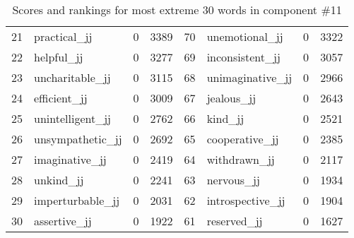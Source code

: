 \begin{table}[tbp]
\begin{tabular}{| rlr@{.}l | rlr@{.}l |}
    21 & practical\_jj & 0 & 3389    &    70 & unemotional\_jj & 0 & 3322 \\
    22 & helpful\_jj & 0 & 3277    &    69 & inconsistent\_jj & 0 & 3057 \\
    23 & uncharitable\_jj & 0 & 3115    &    68 & unimaginative\_jj & 0 & 2966 \\
    24 & efficient\_jj & 0 & 3009    &    67 & jealous\_jj & 0 & 2643 \\
    25 & unintelligent\_jj & 0 & 2762    &    66 & kind\_jj & 0 & 2521 \\
    26 & unsympathetic\_jj & 0 & 2692    &    65 & cooperative\_jj & 0 & 2385 \\
    27 & imaginative\_jj & 0 & 2419    &    64 & withdrawn\_jj & 0 & 2117 \\
    28 & unkind\_jj & 0 & 2241    &    63 & nervous\_jj & 0 & 1934 \\
    29 & imperturbable\_jj & 0 & 2031    &    62 & introspective\_jj & 0 & 1904 \\
    30 & assertive\_jj & 0 & 1922    &    61 & reserved\_jj & 0 & 1627 \\
    \hline
    \end{tabular}
    \caption{Scores and rankings for most extreme 30 words in component \#11} 
\end{table}
\clearpage

